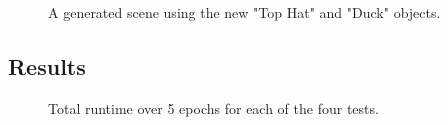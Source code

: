\documentclass[10pt,twocolumn,letterpaper]{article}
\begin{document}
\begin{figure}[t]
\begin{center}
\end{center}
   \caption{A generated scene using the new "Top Hat" and "Duck" objects.}
\label{sceneimg}
\end{figure}

\subsection{Results}

\begin{figure}[t]
\begin{center}
\end{center}
   \caption{Total runtime over 5 epochs for each of the four tests.}
\label{runtime}
\end{figure}
\end{document}
